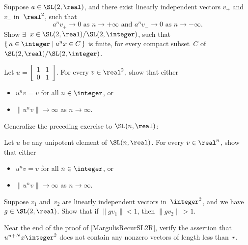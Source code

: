 \begin{exercises}


\item \label{SplitDivergeSL2REx}
Suppose $a \in \SL(2,\real)$, and there exist linearly independent vectors $v_+$ and~$v_-$ in~$\real^2$, such that 
	$$ \text{$a^n v_+ \to 0$ as $n \to +\infty$ \ and \ $a^n v_- \to 0$ as $n \to -\infty$} . $$
Show $\exists$~$x \in \SL(2,\real)/\SL(2,\integer)$, such that $\{\, n \in \integer \mid a^n x \in C \,\}$ is finite, for every compact subset~$C$ of~$\SL(2,\real)/\SL(2,\integer)$.

\item \label{UnipToInftyInR2}
Let $u = \left[\begin{smallmatrix} 1 & 1 \\ 0 & 1 \end{smallmatrix}\right]$. For every $v \in \real^2$, show that either 
	\begin{itemize}
	\item $u^n v = v$ for all $n \in \integer$,
	or
	\item $\|u^n v\| \to \infty$ as $n \to \infty$.
	\end{itemize}

\item
Generalize the preceding exercise to $\SL(n,\real)$:
\par
Let $u$ be any unipotent element of $\SL(n,\real)$. For every $v \in \real^n$, show that either 
	\begin{itemize}
	\item $u^n v = v$ for all $n \in \integer$,
	or
	\item $\|u^n v\| \to \infty$ as $n \to \infty$.
	\end{itemize}

\item \label{2SmallNotIndep}
Suppose $v_1$ and~$v_2$ are linearly independent vectors in~$\integer^2$, and we have $g \in \SL(2,\real)$. Show that if $\|gv_1\| < 1$, then $\|g v_2\| > 1$.

\item \label{MargulisSL2RNotLessR}
Near the end of the proof of \cref{MargulisRecurSL2R}, verify the assertion that $u^{n+N} x \integer^2$ does not contain any nonzero vectors of length less than~$r$.


\end{exercises}
